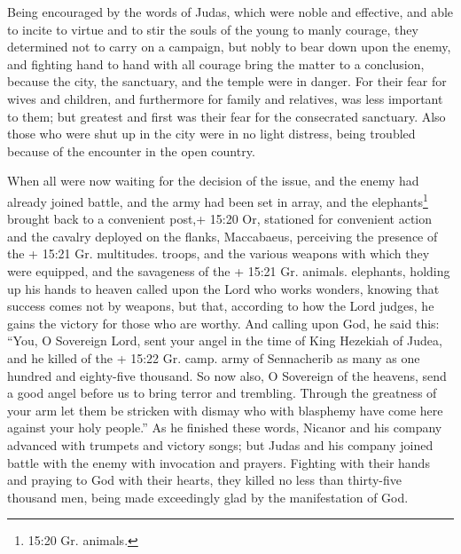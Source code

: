  Being encouraged by the words of Judas, which were noble
and effective, and able to incite to virtue and to stir the souls of the
young to manly courage, they determined not to carry on a campaign, but
nobly to bear down upon the enemy, and fighting hand to hand with all
courage bring the matter to a conclusion, because the city, the
sanctuary, and the temple were in danger.  For their fear
for wives and children, and furthermore for family and relatives, was
less important to them; but greatest and first was their fear for the
consecrated sanctuary.  Also those who were shut up in the
city were in no light distress, being troubled because of the encounter
in the open country.

 When all were now waiting for the decision of the issue,
and the enemy had already joined battle, and the army had been set in
array, and the elephants\footnote{15:20 Gr. animals.} brought back to a
convenient post,+ 15:20 Or, stationed for convenient action and the
cavalry deployed on the flanks,  Maccabaeus, perceiving the
presence of the + 15:21 Gr. multitudes. troops, and the various weapons
with which they were equipped, and the savageness of the + 15:21 Gr.
animals. elephants, holding up his hands to heaven called upon the Lord
who works wonders, knowing that success comes not by weapons, but that,
according to how the Lord judges, he gains the victory for those who are
worthy.  And calling upon God, he said this: ``You, O
Sovereign Lord, sent your angel in the time of King Hezekiah of Judea,
and he killed of the + 15:22 Gr. camp. army of Sennacherib as many as
one hundred and eighty-five thousand.  So now also, O
Sovereign of the heavens, send a good angel before us to bring terror
and trembling.  Through the greatness of your arm let them
be stricken with dismay who with blasphemy have come here against your
holy people.'' As he finished these words,  Nicanor and his
company advanced with trumpets and victory songs;  but
Judas and his company joined battle with the enemy with invocation and
prayers.  Fighting with their hands and praying to God with
their hearts, they killed no less than thirty-five thousand men, being
made exceedingly glad by the manifestation of God.

